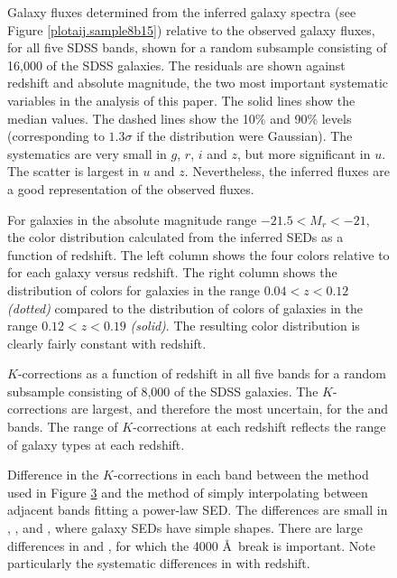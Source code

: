 \clearpage
{}
\begin{figure}
\figurenum{\fignum}
\caption{\label{model} Galaxy fluxes determined from the inferred
galaxy spectra (see Figure \ref{plotaij.sample8b15}) relative to the
observed galaxy fluxes, for all five SDSS bands, shown for a random
subsample consisting of 16,000 of the SDSS galaxies. The
residuals are shown against redshift and absolute magnitude, the two
most important systematic variables in the analysis of this paper. The
solid lines show the median values. The dashed lines show the 10\% and
90\% levels (corresponding to $1.3\sigma$ if the distribution were
Gaussian). The systematics are very small in $g$, $r$, $i$ and $z$,
but more significant in $u$. The scatter is largest in $u$ and
$z$. Nevertheless, the inferred fluxes are a good representation of
the observed fluxes.  }
\end{figure}

\clearpage
{}
\begin{figure}
\figurenum{\fignum}
\caption{\label{colors.sample8b15} For galaxies in the absolute
magnitude range $-21.5<M_r<-21$, the color distribution calculated
from the inferred SEDs as a function of redshift. The left column
shows the four colors relative to  for each galaxy versus
redshift. The right column shows the distribution of colors for
galaxies in the range $0.04<z<0.12$ {\it (dotted)} compared to the
distribution of colors of galaxies in the range $0.12<z<0.19$ {\it
(solid)}. The resulting color distribution is clearly fairly constant
with redshift.}
\end{figure}

\clearpage
{}
\begin{figure}
\figurenum{\fignum}
\caption{\label{kcorrect.sample8b15} $K$-corrections as a function of
redshift in all five bands for a random subsample consisting of 8,000
of the SDSS galaxies. The $K$-corrections are largest, and therefore
the most uncertain, for the  and  bands. The
range of $K$-corrections at each redshift reflects the range of galaxy
types at each redshift.}
\end{figure}

\clearpage
{}
\begin{figure}
\figurenum{\fignum}
\caption{\label{ciCompare.sample8b15} Difference in the
$K$-corrections in each band between the method used in Figure
\ref{kcorrect.sample8b15} and the method of simply interpolating
between adjacent bands fitting a power-law SED. The differences are
small in , , and , where galaxy
SEDs have simple shapes. There are large differences in 
and , for which the 4000 \AA\ break is important. Note
particularly the systematic differences in  with
redshift.}
\end{figure}


